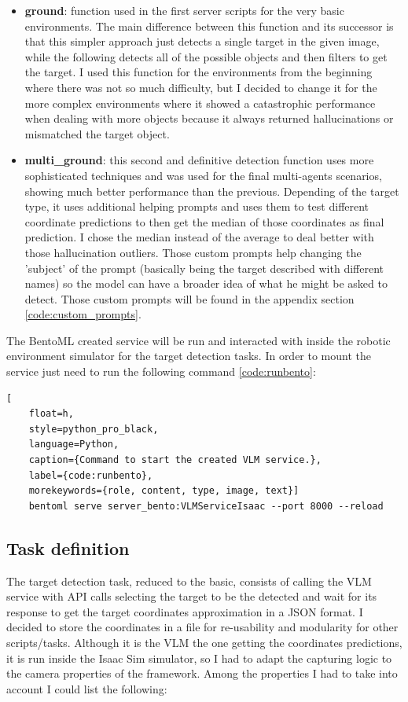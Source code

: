 \begin{itemize}
	\item \textbf{ground}: function used in the first server scripts for the very basic environments. The main difference between this function and its successor is that this simpler approach just detects a single target in the given image, while the following detects all of the possible objects and then filters to get the target. I used this function for the environments from the beginning where there was not so much difficulty, but I decided to change it for the more complex environments where it showed a catastrophic performance when dealing with more objects because it always returned hallucinations or mismatched the target object. 
	
	\item \textbf{multi\_ground}: this second and definitive detection function uses more sophisticated techniques and was used for the final multi-agents scenarios, showing much better performance than the previous. Depending of the target type, it uses additional helping prompts and uses them to test different coordinate predictions to then get the median of those coordinates as final prediction. I chose the median instead of the average to deal better with those hallucination outliers. Those custom prompts help changing the 'subject' of the prompt (basically being the target described with different names) so the model can have a broader idea of what he might be asked to detect. Those custom prompts will be found in the appendix section \ref{code:custom_prompts}. 
\end{itemize}

The BentoML created service will be run and interacted with inside the robotic environment simulator for the target detection tasks. In order to mount the service just need to run the following command \ref{code:runbento}: 

\begin{lstlisting}[
	float=h,
	style=python_pro_black,
	language=Python, 
	caption={Command to start the created VLM service.}, 
	label={code:runbento},
	morekeywords={role, content, type, image, text}]
	bentoml serve server_bento:VLMServiceIsaac --port 8000 --reload
\end{lstlisting}

\subsection{Task definition}
The target detection task, reduced to the basic, consists of calling the VLM service with API calls selecting the target to be the detected and wait for its response to get the target coordinates approximation in a JSON format. I decided to store the coordinates in a file for re-usability and modularity for other scripts/tasks. Although it is the VLM the one getting the coordinates predictions, it is run inside the Isaac Sim simulator, so I had to adapt the capturing logic to the camera properties of the framework. Among the properties I had to take into account I could list the following:

